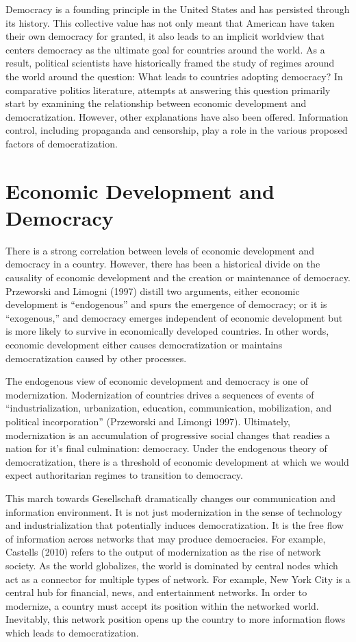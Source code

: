 \documentclass[12pt,]{article}
\begin{document}
Democracy is a founding principle in the United States and has persisted
through its history. This collective value has not only meant that
American have taken their own democracy for granted, it also leads to an
implicit worldview that centers democracy as the ultimate goal for
countries around the world. As a result, political scientists have
historically framed the study of regimes around the world around the
question: What leads to countries adopting democracy? In comparative
politics literature, attempts at answering this question primarily start
by examining the relationship between economic development and
democratization. However, other explanations have also been offered.
Information control, including propaganda and censorship, play a role in
the various proposed factors of democratization.

\hypertarget{economic-development-and-democracy}{%
\section{Economic Development and
Democracy}\label{economic-development-and-democracy}}

There is a strong correlation between levels of economic development and
democracy in a country. However, there has been a historical divide on
the causality of economic development and the creation or maintenance of
democracy. Przeworski and Limogni (1997) distill two arguments, either
economic development is ``endogenous'' and spurs the emergence of
democracy; or it is ``exogenous,'' and democracy emerges independent of
economic development but is more likely to survive in economically
developed countries. In other words, economic development either causes
democratization or maintains democratization caused by other processes.

The endogenous view of economic development and democracy is one of
modernization. Modernization of countries drives a sequences of events
of ``industrialization, urbanization, education, communication,
mobilization, and political incorporation'' (Przeworski and Limongi
1997). Ultimately, modernization is an accumulation of progressive
social changes that readies a nation for it's final culmination:
democracy. Under the endogenous theory of democratization, there is a
threshold of economic development at which we would expect authoritarian
regimes to transition to democracy.

This march towards Gesellschaft dramatically changes our communication
and information environment. It is not just modernization in the sense
of technology and industrialization that potentially induces
democratization. It is the free flow of information across networks that
may produce democracies. For example, Castells (2010) refers to the
output of modernization as the rise of network society. As the world
globalizes, the world is dominated by central nodes which act as a
connector for multiple types of network. For example, New York City is a
central hub for financial, news, and entertainment networks. In order to
modernize, a country must accept its position within the networked
world. Inevitably, this network position opens up the country to more
information flows which leads to democratization.
\end{document}
